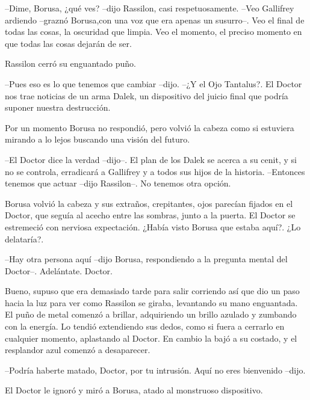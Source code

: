 --Dime, Borusa, ¿qué ves? --dijo Rassilon, casi respetuosamente. 
--Veo Gallifrey ardiendo --graznó Borusa,con una voz que era apenas un susurro--. Veo el final de todas las cosas, la oscuridad que limpia. Veo el momento, el preciso momento en que todas las cosas dejarán de ser. 

Rassilon cerró su enguantado puño. 

--Pues eso es lo que tenemos que cambiar --dijo. --¿Y el Ojo Tantalus?. El Doctor nos trae noticias de un arma Dalek, un dispositivo del juicio final que podría suponer nuestra destrucción. 

Por un momento Borusa no respondió, pero volvió la cabeza como si estuviera mirando a lo lejos buscando una visión del futuro. 

--El Doctor dice la verdad --dijo--. El plan de los Dalek se acerca a su cenit, y si no se controla, erradicará a Gallifrey y a todos sus hijos de la historia. 
--Entonces tenemos que actuar --dijo Rassilon--. No tenemos otra opción.
 
Borusa volvió la cabeza y sus extraños, crepitantes, ojos parecían fijados en el Doctor, que seguía al acecho entre las sombras, junto a la puerta. El Doctor se estremeció con nerviosa expectación. ¿Había visto Borusa que estaba aquí?. ¿Lo delataría?.
 
--Hay otra persona aquí --dijo Borusa, respondiendo a la pregunta mental del Doctor--. Adelántate. Doctor.
 
Bueno, supuso que era demasiado tarde para salir corriendo así que dio un paso hacia la luz para ver como Rassilon se giraba, levantando su mano enguantada. El puño de metal comenzó a brillar, adquiriendo un brillo azulado y zumbando con la energía. Lo tendió extendiendo sus dedos, como si fuera a cerrarlo en cualquier momento, aplastando al Doctor. En cambio la bajó a su costado, y el resplandor azul comenzó a desaparecer. 

--Podría haberte matado, Doctor, por tu intrusión. Aquí no eres bienvenido --dijo. 

El Doctor le ignoró y miró a Borusa, atado al monstruoso dispositivo. 

